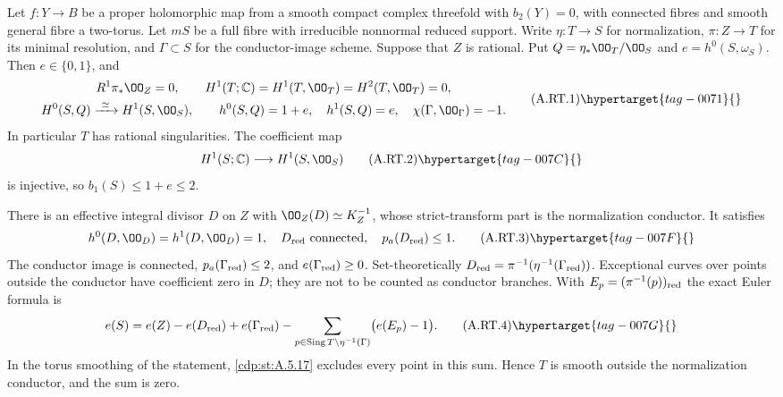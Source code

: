 \begin{proposition}\hypertarget{tag-01B6}{}\label{cdp:st:A.5.16}


Let $f:Y\to B$ be a proper holomorphic map from a smooth compact
complex threefold with $b_2(Y)=0$, with connected fibres and smooth
general fibre a two-torus. Let $mS$ be a full fibre with irreducible
nonnormal reduced support. Write $\eta:T\to S$ for normalization,
$\pi:Z\to T$ for its minimal resolution, and $\Gamma\subset S$
for the conductor-image scheme. Suppose that $Z$ is rational.
Put $Q=\eta_*\OO_T/\OO_S$ and $e=h^0(S,\omega_S)$.
Then $e\in\{0,1\}$, and
\[
\begin{gathered}
 R^1\pi_*\OO_Z=0,\qquad
 H^1(T;\mathbb C)=H^1(T,\OO_T)=H^2(T,\OO_T)=0,\\
 H^0(S,Q)\xrightarrow{\ \simeq\ }H^1(S,\OO_S),\qquad
 h^0(S,Q)=1+e,\quad h^1(S,Q)=e,\quad
 \chi(\Gamma,\OO_\Gamma)=-1.
\end{gathered}
\tag{A.RT.1}\hypertarget{tag-0071}{}\label{cdp:eq:A.RT.1}
\]
In particular $T$ has rational singularities. The coefficient map
\[
 H^1(S;\mathbb C)\longrightarrow H^1(S,\OO_S)
\tag{A.RT.2}\hypertarget{tag-007C}{}\label{cdp:eq:A.RT.2}
\]
is injective, so $b_1(S)\le1+e\le2$.

There is an effective integral divisor $D$ on $Z$ with
$\OO_Z(D)\simeq K_Z^{-1}$, whose strict-transform part is the
normalization conductor. It satisfies
\[
 h^0(D,\OO_D)=h^1(D,\OO_D)=1,
 \quad D_{\rm red}\text{ connected},
 \quad p_a(D_{\rm red})\le1.
\tag{A.RT.3}\hypertarget{tag-007F}{}\label{cdp:eq:A.RT.3}
\]
The conductor image is connected,
$p_a(\Gamma_{\rm red})\le2$, and
$e(\Gamma_{\rm red})\ge0$. Set-theoretically
$D_{\rm red}=\pi^{-1}(\eta^{-1}(\Gamma_{\rm red}))$.
Exceptional curves over points outside the conductor have
coefficient zero in $D$; they are not to be counted as conductor
branches. With $E_p=(\pi^{-1}(p))_{\rm red}$ the exact Euler
formula is
\[
 e(S)=e(Z)-e(D_{\rm red})+e(\Gamma_{\rm red})
       -\sum_{p\in\operatorname{Sing}T\setminus\eta^{-1}(\Gamma)}
                  \bigl(e(E_p)-1\bigr).
\tag{A.RT.4}\hypertarget{tag-007G}{}\label{cdp:eq:A.RT.4}
\]
In the torus smoothing of the statement, \ref{cdp:st:A.5.17} excludes
every point in this sum. Hence $T$ is smooth outside the
normalization conductor, and the sum is zero.
\end{proposition}

